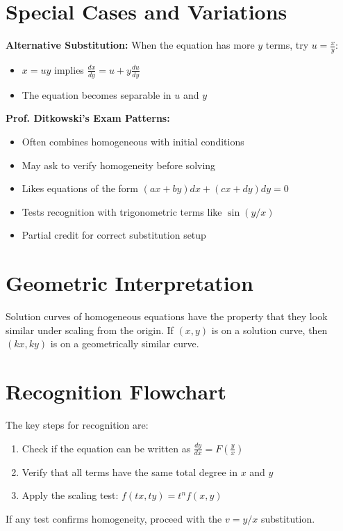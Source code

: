 \documentclass[12pt]{article}
\begin{document}
\section{Special Cases and Variations}

\begin{insight}
\textbf{Alternative Substitution:}
When the equation has more $y$ terms, try $u = \frac{x}{y}$:
\begin{itemize}
    \item $x = uy$ implies $\frac{dx}{dy} = u + y\frac{du}{dy}$
    \item The equation becomes separable in $u$ and $y$
\end{itemize}
\end{insight}

\begin{examtip}
\textbf{Prof. Ditkowski's Exam Patterns:}
\begin{itemize}
    \item Often combines homogeneous with initial conditions
    \item May ask to verify homogeneity before solving
    \item Likes equations of the form $(ax + by)dx + (cx + dy)dy = 0$
    \item Tests recognition with trigonometric terms like $\sin(y/x)$
    \item Partial credit for correct substitution setup
\end{itemize}
\end{examtip}

\section{Geometric Interpretation}

Solution curves of homogeneous equations have the property that they look similar under scaling from the origin. If $(x,y)$ is on a solution curve, then $(kx, ky)$ is on a geometrically similar curve.

\section{Recognition Flowchart}

The key steps for recognition are:
\begin{enumerate}
\item Check if the equation can be written as $\frac{dy}{dx} = F\left(\frac{y}{x}\right)$
\item Verify that all terms have the same total degree in $x$ and $y$
\item Apply the scaling test: $f(tx, ty) = t^n f(x,y)$
\end{enumerate}

If any test confirms homogeneity, proceed with the $v = y/x$ substitution.
\end{document}
